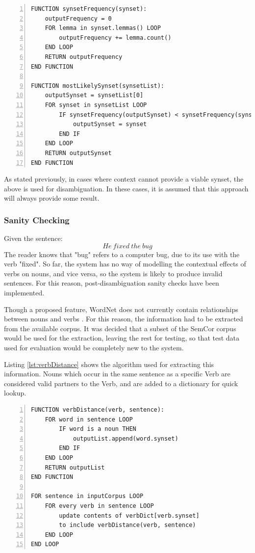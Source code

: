 \documentclass[]{article}
\begin{document}
\begin{lstlisting}[numbers=left, numberstyle=\small, caption={The synsetFrequency and mostLikelySynset functions}, captionpos=b, label={lst:synsetFrequency}]
FUNCTION synsetFrequency(synset):
    outputFrequency = 0
    FOR lemma in synset.lemmas() LOOP
        outputFrequency += lemma.count()
    END LOOP
    RETURN outputFrequency
END FUNCTION

FUNCTION mostLikelySynset(synsetList):
    outputSynset = synsetList[0]
    FOR synset in synsetList LOOP
        IF synsetFrequency(outputSynset) < synsetFrequency(synset) THEN
            outputSynset = synset
        END IF
    END LOOP
    RETURN outputSynset
END FUNCTION
\end{lstlisting}

As stated previously, in cases where context cannot provide a viable synset, the above is used for disambiguation. In these cases, it is assumed that this approach will always provide some result.

\subsubsection{Sanity Checking}
\label{sec:Sanity}
Given the sentence:
\[He\: fixed\: the\: bug\]
The reader knows that "bug" refers to a computer bug, due to its use with the verb "fixed". So far, the system has no way of modelling the contextual effects of verbs on nouns, and vice versa, so the system is likely to produce invalid sentences. For this reason, post-disambiguation sanity checks have been implemented.

Though a proposed feature, WordNet does not currently contain relationships between nouns and verbs \cite{WN4Verbs}. For this reason, the information had to be extracted from the available corpus. It was decided that a subset of the SemCor corpus would be used for the extraction, leaving the rest for testing, so that test data used for evaluation would be completely new to the system.

Listing \ref{lst:verbDistance} shows the algorithm used for extracting this information. Nouns which occur in the same sentence as a specific Verb are considered valid partners to the Verb, and are added to a dictionary for quick lookup.

\begin{lstlisting}[numbers=left, numberstyle=\small, caption={The noun-verb relationship learning algorithm}, captionpos=b, label={lst:verbDistance}]
FUNCTION verbDistance(verb, sentence):
	FOR word in sentence LOOP
		IF word is a noun THEN
			outputList.append(word.synset)
		END IF
	END LOOP
	RETURN outputList
END FUNCTION			

FOR sentence in inputCorpus LOOP
	FOR every verb in sentence LOOP
		update contents of verbDict[verb.synset] 
		to include verbDistance(verb, sentence)
	END LOOP
END LOOP
\end{lstlisting}
\end{document}
